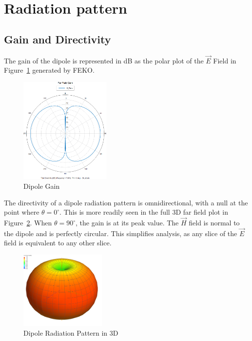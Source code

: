\section{Radiation pattern}

\subsection{Gain and Directivity}
The gain of the dipole is represented in dB as the polar plot of the $\vec{E}$
Field in Figure~\ref{fig:pgain} generated by FEKO.

\begin{figure}[h!]
  \centering
  \includegraphics[width=0.40\textwidth]{./img/polgain.png}
  \caption{Dipole Gain}
  \label{fig:pgain}
\end{figure}
The directivity of a dipole radiation pattern is omnidirectional, with a null
at the point where $\theta=0^\circ$. This is more readily seen in the full 3D
far field plot in Figure~\ref{fig:3D}. When $\theta=90^\circ$, the gain is at
its peak value. The $\vec{H}$ field is normal to the dipole and is perfectly
circular. This simplifies analysis, as any slice of the $\vec{E}$ field is
equivalent to any other slice.

\begin{figure}[h!]
  \centering
  \includegraphics[width=0.38\textwidth]{./img/Gain.png}
  \caption{Dipole Radiation Pattern in 3D}
  \label{fig:3D}
\end{figure}

